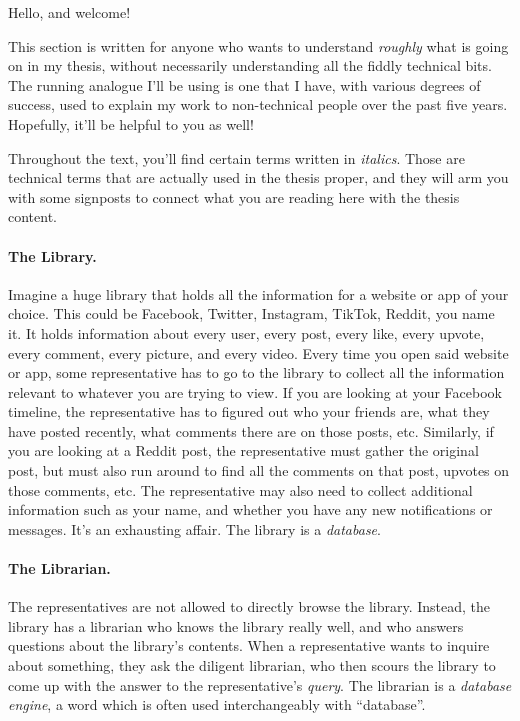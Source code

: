 Hello, and welcome!

This section is written for anyone who wants to understand \emph{roughly} what
is going on in my thesis, without necessarily understanding all the fiddly
technical bits. The running analogue I'll be using is one that I have, with
various degrees of success, used to explain my work to non-technical people over
the past five years. Hopefully, it'll be helpful to you as well!

Throughout the text, you'll find certain terms written in \textit{italics}.
Those are technical terms that are actually used in the thesis proper, and they
will arm you with some signposts to connect what you are reading here with the
thesis content.

\paragraph{The Library.}
%
Imagine a huge library that holds all the information for a website or app of
your choice. This could be Facebook, Twitter, Instagram, TikTok, Reddit, you
name it. It holds information about every user, every post, every like, every
upvote, every comment, every picture, and every video. Every time you open said
website or app, some representative has to go to the library to collect all the
information relevant to whatever you are trying to view. If you are looking at
your Facebook timeline, the representative has to figured out who your friends
are, what they have posted recently, what comments there are on those posts,
etc. Similarly, if you are looking at a Reddit post, the representative must
gather the original post, but must also run around to find all the comments on
that post, upvotes on those comments, etc. The representative may also need to
collect additional information such as your name, and whether you have any new
notifications or messages. It's an exhausting affair. The library is a
\textit{database}.

\paragraph{The Librarian.}
%
The representatives are not allowed to directly browse the library. Instead, the
library has a librarian who knows the library really well, and who answers
questions about the library's contents. When a representative wants to inquire
about something, they ask the diligent librarian, who then scours the library to
come up with the answer to the representative's \textit{query}. The librarian is
a \textit{database engine}, a word which is often used interchangeably with
``database''.

